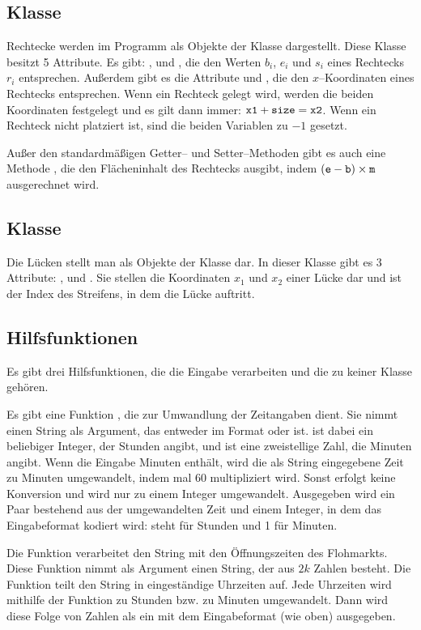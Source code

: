 \subsection{Klasse }
Rechtecke werden im Programm als Objekte der Klasse  dargestellt.
Diese Klasse besitzt 5 Attribute.
Es gibt: ,  und ,
die den Werten $b_i$, $e_i$ und $s_i$ eines Rechtecks $r_i$ entsprechen.
Außerdem gibt es die Attribute  und ,
die den $x$--Koordinaten eines Rechtecks entsprechen.
Wenn ein Rechteck gelegt wird, werden die beiden Koordinaten festgelegt und 
es gilt dann immer: $\texttt{x1} + \texttt{size} = \texttt{x2}$. 
Wenn ein Rechteck nicht platziert ist, sind die beiden Variablen zu $-1$ gesetzt.

Außer den standardmäßigen Getter-- und Setter--Methoden gibt es auch eine Methode
, die den Flächeninhalt des Rechtecks ausgibt, indem $(\texttt{e}-\texttt{b})\times \texttt{m}$
ausgerechnet wird. 

\subsection{Klasse }
Die Lücken stellt man als Objekte der Klasse  dar. 
In dieser Klasse gibt es 3 Attribute: ,  und .
Sie stellen die Koordinaten $x_1$ und $x_2$ einer Lücke dar und
 ist der Index des Streifens, in dem die Lücke auftritt.


\subsection{Hilfsfunktionen}
Es gibt drei Hilfsfunktionen, die die Eingabe verarbeiten und die zu keiner Klasse gehören.

Es gibt eine Funktion , die zur Umwandlung der Zeitangaben dient.
Sie nimmt einen String als Argument, das entweder im Format  oder  ist.
 ist dabei ein beliebiger Integer, der
Stunden angibt, und  ist eine zweistellige Zahl, die Minuten angibt. 
Wenn die Eingabe Minuten enthält, wird die als String eingegebene Zeit zu Minuten umgewandelt,
indem  mal 60 multipliziert wird. Sonst erfolgt keine Konversion und  wird nur 
zu einem Integer umgewandelt.
Ausgegeben wird ein Paar bestehend aus der umgewandelten Zeit und einem Integer, in dem 
das Eingabeformat kodiert wird: steht für Stunden und 1 für Minuten.

Die Funktion  verarbeitet den String mit den Öffnungszeiten 
des Flohmarkts.
Diese Funktion nimmt als Argument einen String, der aus $2k$ Zahlen besteht.
Die Funktion teilt den String in eingeständige Uhrzeiten auf.
Jede Uhrzeiten wird mithilfe der Funktion  zu Stunden bzw. zu Minuten umgewandelt.
Dann wird diese Folge von Zahlen als ein  mit dem Eingabeformat (wie oben) ausgegeben.

